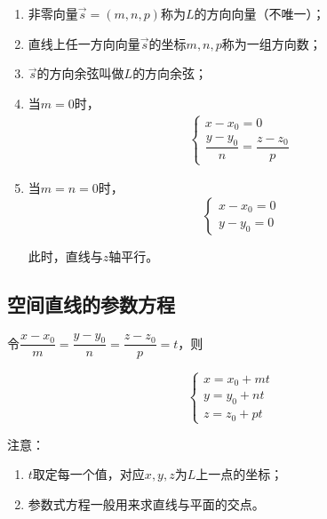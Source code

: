 \documentclass[
	11pt, %
	a4paper, %
]{WhuSakuraBook}
\begin{document}
    \begin{enumerate}
        \item 非零向量\(\overrightarrow{s} = \left(m, n, p\right)\)称为\(L\)的方向向量（不唯一）；
        \item 直线上任一方向向量\(\overrightarrow{s}\)的坐标\(m, n, p\)称为一组方向数；
        \item \(\overrightarrow{s}\)的方向余弦叫做\(L\)的方向余弦；
        \item 当\(m = 0\)时，
            \begin{align}
                \left\{\begin{array}{l}
                x-x_0=0 \\
                \dfrac{y-y_0}{n}=\dfrac{z-z_0}{p}
                \end{array}\right.
            \end{align}
        \item 当\(m = n = 0\)时，
            \begin{equation}
                \left\{\begin{array}{l}
                x-x_0=0 \\
                y-y_0=0
                \end{array}\right.
            \end{equation}

            此时，直线与\(z\)轴平行。
    \end{enumerate}

\subsection{空间直线的参数方程}

    令$\dfrac{x-x_0}{m}=\dfrac{y-y_0}{n}=\dfrac{z-z_0}{p}=t$，则

    \begin{equation}
        \left\{\begin{array}{l}
        x=x_0+m t \\
        y=y_0+n t \\
        z=z_0+p t
        \end{array}\right.
    \end{equation}

    注意：

    \begin{enumerate}
        \item \(t\)取定每一个值，对应\(x, y, z\)为\(L\)上一点的坐标；
        \item 参数式方程一般用来求直线与平面的交点。
    \end{enumerate}
\end{document}

